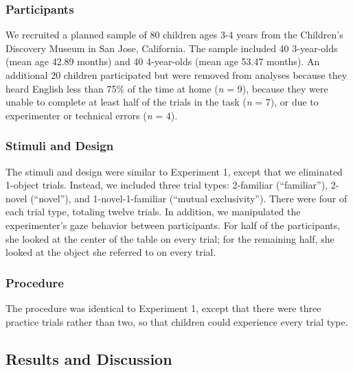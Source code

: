 \documentclass[10pt, letterpaper]{article}
\begin{document}
\subsubsection{Participants}\label{participants-1}

We recruited a planned sample of 80 children ages 3-4 years from the
Children's Discovery Museum in San Jose, California. The sample included
40 3-year-olds (mean age 42.89 months) and 40 4-year-olds (mean age
53.47 months). An additional 20 children participated but were removed
from analyses because they heard English less than 75\% of the time at
home (\emph{n} = 9), because they were unable to complete at least half
of the trials in the task (\emph{n} = 7), or due to experimenter or
technical errors (\emph{n} = 4).

\subsubsection{Stimuli and Design}\label{stimuli-and-design-1}

The stimuli and design were similar to Experiment 1, except that we
eliminated 1-object trials. Instead, we included three trial types:
2-familiar (``familiar''), 2-novel (``novel''), and 1-novel-1-familiar
(``mutual exclusivity''). There were four of each trial type, totaling
twelve trials. In addition, we manipulated the experimenter's gaze
behavior between participants. For half of the participants, she looked
at the center of the table on every trial; for the remaining half, she
looked at the object she referred to on every trial.

\subsubsection{Procedure}\label{procedure-1}

The procedure was identical to Experiment 1, except that there were
three practice trials rather than two, so that children could experience
every trial type.

\subsection{Results and Discussion}\label{results-and-discussion-1}
\end{document}
